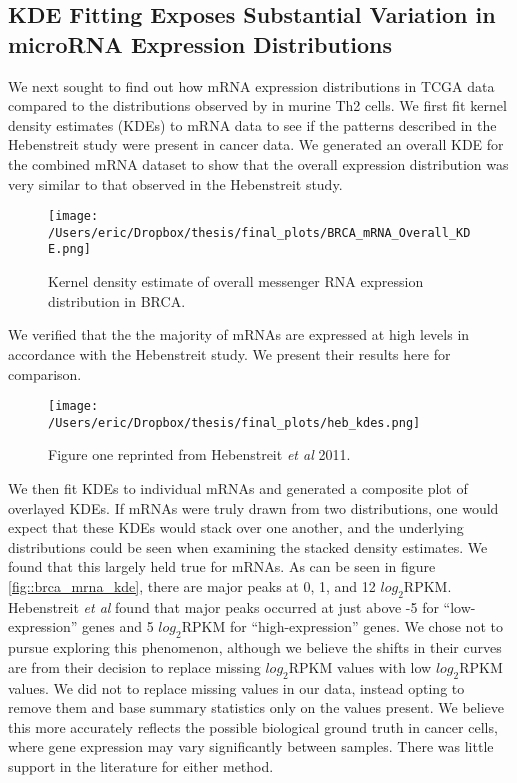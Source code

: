 \documentclass[12pt]{report}
\begin{document}


\subsection*{KDE Fitting Exposes Substantial Variation in microRNA Expression Distributions}
We next sought to find out how mRNA expression distributions in TCGA data compared to the distributions observed by \cite{Hebenstreit2011} in murine Th2 cells. We first fit kernel density estimates (KDEs) to 
mRNA data to see if the patterns described in the Hebenstreit study were present in cancer data. We generated an overall KDE for the combined mRNA dataset to show
that the overall expression distribution was very similar to that observed in the Hebenstreit study.

\begin{figure}[H]
\centering
 \texttt{[image: /Users/eric/Dropbox/thesis/final\_plots/BRCA\_mRNA\_Overall\_KDE.png]}
 \caption{Kernel density estimate of overall messenger RNA expression distribution in BRCA.}
 \label{fig::brca_mrna_overall_kde}
\end{figure}

We verified that the the majority of mRNAs are expressed at high levels in accordance with the Hebenstreit study.  We present their results here for comparison.

\begin{figure}[H]
\centering
 \texttt{[image: /Users/eric/Dropbox/thesis/final\_plots/heb\_kdes.png]}
 \caption{Figure one reprinted from Hebenstreit \textit{et al } 2011.}
 \label{fig::brca_mrna_and_heb}
\end{figure}

We then fit KDEs to individual mRNAs and generated a composite plot of overlayed KDEs. If mRNAs were truly drawn from two distributions, one would expect that these
KDEs would stack over one another, and the underlying distributions could be seen when examining the stacked density estimates. We found that this largely held true for mRNAs.
As can be seen in figure \ref{fig::brca_mrna_kde}, there are major peaks at 0, 1, and 12 $log_{2} \text{RPKM}$. Hebenstreit \textit{et al} found that major peaks occurred at just above -5 
for ``low-expression'' genes and 5 $log_{2} \text{RPKM}$ for ``high-expression'' genes. We chose not to pursue exploring this phenomenon, although we believe the shifts in their curves
are from their decision to replace missing $log_{2} \text{RPKM}$ values with low $log_{2} \text{RPKM}$ values. We did not to replace missing values in our data, instead opting to remove them
and base summary statistics only on the values present. We believe this more accurately reflects the possible biological ground truth in cancer cells, where gene expression may vary
significantly between samples. There was little support in the literature for either method. %
\end{document}
